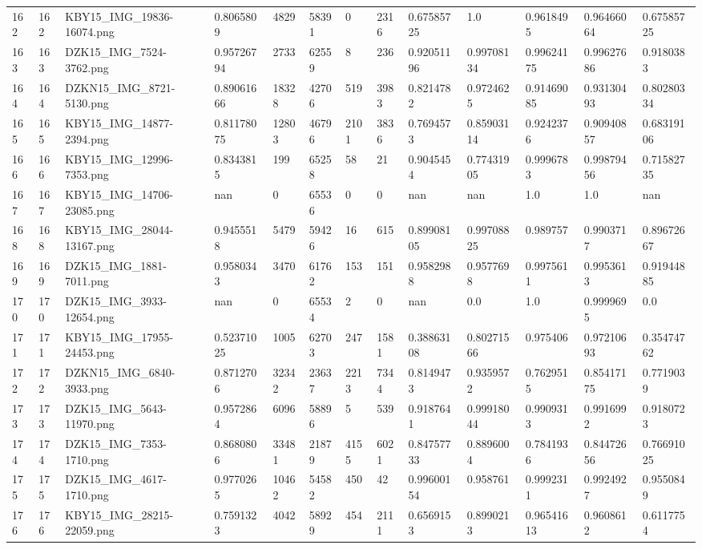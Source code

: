 \documentclass[11pt, a4paper, twoside]{report}
\begin{document}
\begin{longtable}[c]{@{}lllllllllllll@{}}
162 & 162 & KBY15\_IMG\_19836-16074.png & 0.8065809 & 4829 & 58391 & 0 & 2316 & 0.67585725 & 1.0 & 0.9618495 & 0.96466064 & 0.67585725 \\
163 & 163 & DZK15\_IMG\_7524-3762.png & 0.95726794 & 2733 & 62559 & 8 & 236 & 0.92051196 & 0.99708134 & 0.99624175 & 0.99627686 & 0.9180383 \\
164 & 164 & DZKN15\_IMG\_8721-5130.png & 0.89061666 & 18328 & 42706 & 519 & 3983 & 0.8214782 & 0.9724625 & 0.91469085 & 0.93130493 & 0.80280334 \\
165 & 165 & KBY15\_IMG\_14877-2394.png & 0.81178075 & 12803 & 46796 & 2101 & 3836 & 0.7694573 & 0.85903114 & 0.9242376 & 0.90940857 & 0.68319106 \\
166 & 166 & KBY15\_IMG\_12996-7353.png & 0.8343815 & 199 & 65258 & 58 & 21 & 0.9045454 & 0.77431905 & 0.9996783 & 0.99879456 & 0.71582735 \\
167 & 167 & KBY15\_IMG\_14706-23085.png & nan & 0 & 65536 & 0 & 0 & nan & nan & 1.0 & 1.0 & nan \\
168 & 168 & KBY15\_IMG\_28044-13167.png & 0.9455518 & 5479 & 59426 & 16 & 615 & 0.89908105 & 0.99708825 & 0.989757 & 0.9903717 & 0.89672667 \\
169 & 169 & DZK15\_IMG\_1881-7011.png & 0.9580343 & 3470 & 61762 & 153 & 151 & 0.9582988 & 0.9577698 & 0.9975611 & 0.9953613 & 0.91944885 \\
170 & 170 & DZK15\_IMG\_3933-12654.png & nan & 0 & 65534 & 2 & 0 & nan & 0.0 & 1.0 & 0.9999695 & 0.0 \\
171 & 171 & KBY15\_IMG\_17955-24453.png & 0.52371025 & 1005 & 62703 & 247 & 1581 & 0.38863108 & 0.80271566 & 0.975406 & 0.97210693 & 0.35474762 \\
172 & 172 & DZKN15\_IMG\_6840-3933.png & 0.8712706 & 32342 & 23637 & 2213 & 7344 & 0.8149473 & 0.9359572 & 0.7629515 & 0.85417175 & 0.7719039 \\
173 & 173 & DZK15\_IMG\_5643-11970.png & 0.9572864 & 6096 & 58896 & 5 & 539 & 0.9187641 & 0.99918044 & 0.9909313 & 0.9916992 & 0.9180723 \\
174 & 174 & DZK15\_IMG\_7353-1710.png & 0.8680806 & 33481 & 21879 & 4155 & 6021 & 0.84757733 & 0.8896004 & 0.7841936 & 0.84472656 & 0.76691025 \\
175 & 175 & DZK15\_IMG\_4617-1710.png & 0.9770265 & 10462 & 54582 & 450 & 42 & 0.99600154 & 0.958761 & 0.9992311 & 0.9924927 & 0.9550849 \\
176 & 176 & KBY15\_IMG\_28215-22059.png & 0.7591323 & 4042 & 58929 & 454 & 2111 & 0.6569153 & 0.8990213 & 0.96541613 & 0.9608612 & 0.6117754 \\

\end{longtable}
\end{document}
